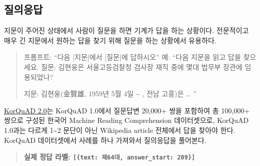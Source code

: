 \documentclass[
  letterpaper,
]{book}
\begin{document}
\hypertarget{uxc9c8uxc758uxc751uxb2f5}{%
\subsection{질의응답}\label{uxc9c8uxc758uxc751uxb2f5}}

지문이 주어진 상태에서 사람이 질문을 하면 기계가 답을 하는 상황이다.
전문적이고 매우 긴 지문에서 원하는 답을 찾기 위해 질문을 하는 상황에서
유용하다.

\begin{quote}
프롬프트: ``다음 {[}지문{]}에서 {[}질문{]}에 답하시오'' 예: ``다음
지문을 읽고 답을 찾으세요. 질문: 김현웅은 서울고등검찰청 검사장 재직
중에 몇대 법무부 장관에 임용되었나?

지문: 김현웅(金賢雄, 1959년 5월 4일 \textasciitilde{} , 전남 고흥)은
\ldots{} ''
\end{quote}

\href{https://korquad.github.io/}{KorQuAD 2.0}는 KorQuAD 1.0에서
질문답변 20,000+ 쌍을 포함하여 총 100,000+ 쌍으로 구성된 한국어 Machine
Reading Comprehension 데이터셋으로, KorQuAD 1.0과는 다르게
1\textasciitilde2 문단이 아닌 Wikipedia article 전체에서 답을 찾아야
한다. KorQuAD 데이터셋에서 사례를 하나 가져와서 질의응답을 풀어본다.

\begin{quote}
\textbf{실제 정답 라벨:
\texttt{{[}\{\textquotesingle{}text\textquotesingle{}:\ \textquotesingle{}제64대\textquotesingle{},\ \textquotesingle{}answer\_start\textquotesingle{}:\ 209\}{]}}}
\end{quote}
\end{document}
